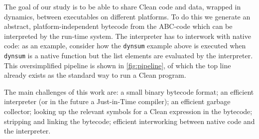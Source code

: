 \documentclass[a4paper]{article}
\begin{document}
The goal of our study is to be able to share Clean code and data, wrapped in dynamics, between executables on different platforms.
To do this we generate an abstract, platform-independent bytecode from the ABC-code which can be interpreted by the run-time system.
The interpreter has to interwork with native code:
	as an example, consider how the \texttt{dynsum} example above is executed when \texttt{dynsum} is a native function but the list elements are evaluated by the interpreter.
This oversimplified pipeline is shown in \cref{fig:pipeline}, of which the top line already exists as the standard way to run a Clean program.

The main challenges of this work are:
	a small binary bytecode format;
	an efficient interpreter (or in the future a Just-in-Time compiler);
	an efficient garbage collector;
	looking up the relevant symbols for a Clean expression in the bytecode;
	stripping and linking the bytecode;
	efficient interworking between native code and the interpreter.

\begin{figure*}[b]
	\centering
	\caption{The final pipeline.\label{fig:pipeline}}
\end{figure*}

\printbibliography
\end{document}
